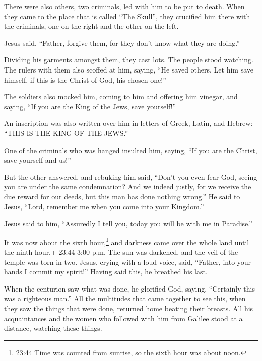 There were also others, two criminals, led with him to be
put to death.  When they came to the place that is called
``The Skull'', they crucified him there with the criminals, one on the
right and the other on the left.

 Jesus said, ``Father, forgive them, for they don't know
what they are doing.''

Dividing his garments amongst them, they cast lots.  The
people stood watching. The rulers with them also scoffed at him, saying,
``He saved others. Let him save himself, if this is the Christ of God,
his chosen one!''

 The soldiers also mocked him, coming to him and offering
him vinegar,  and saying, ``If you are the King of the
Jews, save yourself!''

 An inscription was also written over him in letters of
Greek, Latin, and Hebrew: ``THIS IS THE KING OF THE JEWS.''

 One of the criminals who was hanged insulted him, saying,
``If you are the Christ, save yourself and us!''

 But the other answered, and rebuking him said, ``Don't you
even fear God, seeing you are under the same condemnation? 
And we indeed justly, for we receive the due reward for our deeds, but
this man has done nothing wrong.''  He said to Jesus,
``Lord, remember me when you come into your Kingdom.''

 Jesus said to him, ``Assuredly I tell you, today you will
be with me in Paradise.''

 It was now about the sixth hour,\footnote{23:44 Time was
  counted from sunrise, so the sixth hour was about noon.} and darkness
came over the whole land until the ninth hour.+ 23:44 3:00 p.m.
 The sun was darkened, and the veil of the temple was torn
in two.  Jesus, crying with a loud voice, said, ``Father,
into your hands I commit my spirit!'' Having said this, he breathed his
last.

 When the centurion saw what was done, he glorified God,
saying, ``Certainly this was a righteous man.''  All the
multitudes that came together to see this, when they saw the things that
were done, returned home beating their breasts.  All his
acquaintances and the women who followed with him from Galilee stood at
a distance, watching these things.


